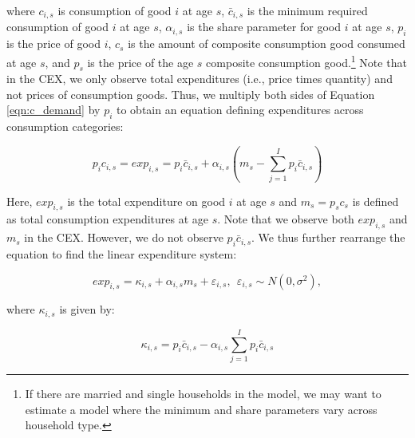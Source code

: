 \documentclass[article,11pt,letterpaper,fleqn]{article}
\theoremstyle{definition}
\numberwithin{equation}{section}
\begin{document}
\noindent\noindent where $c_{i,s}$ is consumption of good $i$ at age $s$, $\bar{c}_{i,s}$ is the minimum required consumption of good $i$ at age $s$, $\alpha_{i,s}$ is the share parameter for good $i$ at age $s$, $p_{i}$ is the price of good $i$, $c_{s}$ is the amount of composite consumption good consumed at age $s$, and $p_{s}$ is the price of the age $s$ composite consumption good.\footnote{If there are married and single households in the model, we may want to estimate a model where the minimum and share parameters vary across household type.}  Note that in the CEX, we only observe total expenditures (i.e., price times quantity) and not prices of consumption goods.  Thus, we multiply both sides of Equation \ref{eqn:c_demand} by $p_{i}$ to obtain an equation defining expenditures across consumption categories:

\begin{equation}
\label{eqn:cp_demand}
p_{i}c_{i,s}=exp_{i,s}=p_{i}\bar{c}_{i,s} + \alpha_{i,s}\left(m_{s}-\sum_{j=1}^{I}p_{i}\bar{c}_{i,s}\right)
\end{equation}

\noindent\noindent Here, $exp_{i,s}$ is the total expenditure on good $i$ at age $s$ and $m_{s}=p_{s}c_{s}$ is defined as total consumption expenditures at age $s$.  Note that we observe both $exp_{i,s}$ and $m_{s}$ in the CEX.  However, we do not observe $p_{i}\bar{c}_{i,s}$.  We thus further rearrange the equation to find the linear expenditure system: 

\begin{equation}
\label{eqn:exp_eqn}
exp_{i,s}=\kappa_{i,s} + \alpha_{i,s}m_{s}+\varepsilon_{i,s}, \ \ \varepsilon_{i,s}\sim N(0,\sigma^{2}),
\end{equation}

\noindent\noindent where $\kappa_{i,s}$ is given by:

\begin{equation}
\label{eqn:kappa}
\kappa_{i,s}=p_{i}\bar{c}_{i,s} - \alpha_{i,s}\sum_{j=1}^{I}p_{i}\bar{c}_{i,s}
\end{equation}
\end{document}
